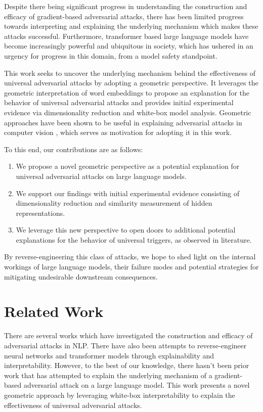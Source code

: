 \documentclass{article}
\theoremstyle{plain}
\theoremstyle{definition}
\theoremstyle{remark}
\begin{document}
Despite there being significant progress in understanding the construction and efficacy of gradient-based adversarial attacks, there has been limited progress towards interpreting and explaining the underlying mechanism which makes these attacks successful. Furthermore, transformer based large language models have become increasingly powerful and ubiquitous in society, which has ushered in an urgency for progress in this domain, from a model safety standpoint. 

This work seeks to uncover the underlying mechanism behind the effectiveness of universal adversarial attacks by adopting a geometric perspective. It leverages the geometric interpretation of word embeddings to propose an explanation for the behavior of universal adversarial attacks and provides initial experimental evidence via dimensionality reduction and white-box model analysis. Geometric approaches have been shown to be useful in explaining adversarial attacks in computer vision \cite{ilyas2019adversarial, engstrom2019a}, which serves as motivation for adopting it in this work. 

To this end, our contributions are as follows:

\begin{enumerate}
    \item We propose a novel geometric perspective as a potential explanation for universal adversarial attacks on large language models.
    \item We support our findings with initial experimental evidence consisting of dimensionality reduction and similarity measurement of hidden representations. 
    \item We leverage this new perspective to open doors to additional potential explanations for the behavior of universal triggers, as observed in literature.
\end{enumerate}

By reverse-engineering this class of attacks, we hope to shed light on the internal workings of large language models, their failure modes and potential strategies for mitigating undesirable downstream consequences.


\section{Related Work}
There are several works which have investigated the construction and efficacy of adversarial attacks in NLP. There have also been attempts to reverse-engineer neural networks and transformer models through explainability and interpretability. However, to the best of our knowledge, there hasn't been prior work that has attempted to explain the underlying mechanism of a gradient-based adversarial attack on a large language model. This work presents a novel geometric approach by leveraging white-box interpretability to explain the effectiveness of universal adversarial attacks. 
\end{document}

